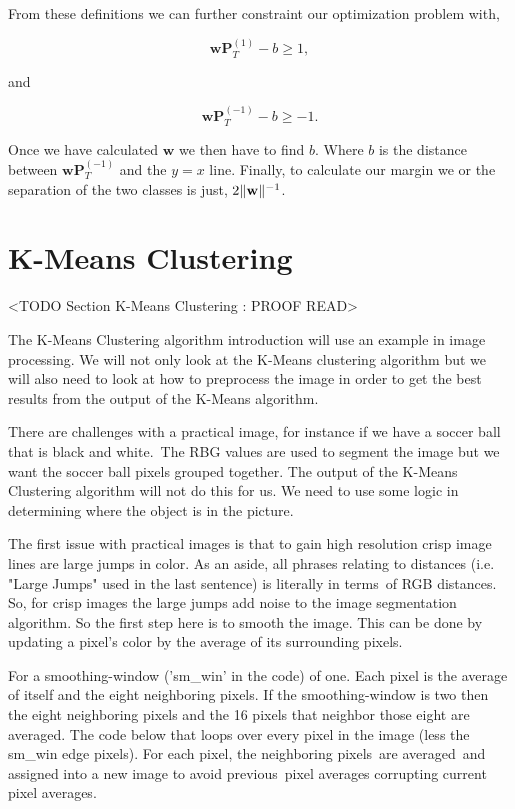 From these definitions we can further constraint our optimization problem with,

\begin{equation}
\mathbf{w}\mathbf{P}^{(1)}_T - b \geq 1,
\end{equation}

and

\begin{equation}
\mathbf{w}\mathbf{P}^{(-1)}_T - b \geq -1.
\end{equation}

Once we have calculated $\mathbf{w}$ we then have to find $b$. Where $b$ is the distance between $\mathbf{w}\mathbf{P}^{(-1)}_T$ and the $y=x$ line. Finally, to calculate our margin we or the separation of the two classes is just, $2\| \mathbf{w} \|^{-1}$.

\section{K-Means Clustering}
	<TODO Section K-Means Clustering : PROOF READ>

The K-Means Clustering algorithm introduction will use an example in image processing. We will not only look at the K-Means clustering algorithm but we will also need to look at how to preprocess the image in order to get the best results from the output of the K-Means algorithm. 

There are challenges with a practical image, for instance if we have a soccer ball that is black and white. The \ac{RBG} values are used to segment the image but we want the soccer ball pixels grouped together. The output of the K-Means Clustering algorithm will not do this for us. We need to use some logic in determining where the object is in the picture.

The first issue with practical images is that to gain high resolution crisp image lines are large jumps in color. As an aside, all phrases relating to distances (i.e. "Large Jumps" used in the last sentence) is literally in terms of \ac{RGB} distances. So, for crisp images the large jumps add noise to the image segmentation algorithm. So the first step here is to smooth the image. This can be done by updating a pixel's color by the average of its surrounding pixels.

For a smoothing-window ('sm\_win' in the code) of one. Each pixel is the average of itself and the eight neighboring pixels. If the smoothing-window is two then the eight neighboring pixels and the 16 pixels that neighbor those eight are averaged. The code below that loops over every pixel in the image (less the sm\_win edge pixels). For each pixel, the neighboring pixels are averaged and assigned into a new image to avoid previous pixel averages corrupting current pixel averages.

